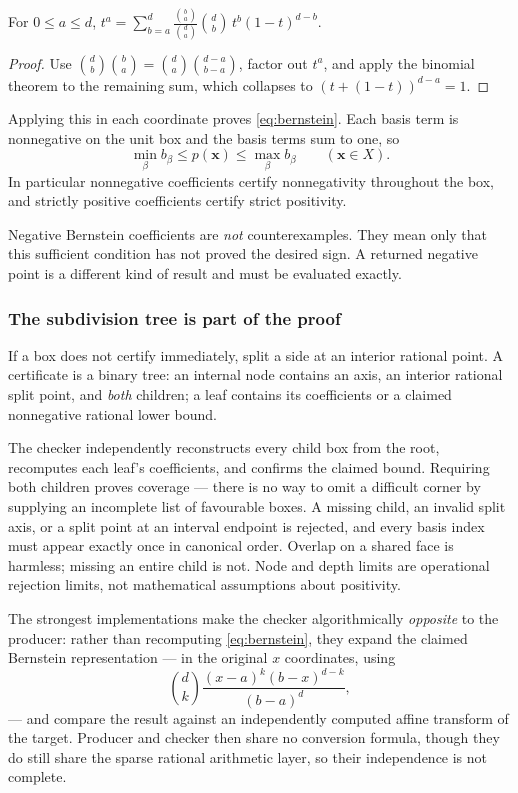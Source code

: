\begin{lemma}
For $0\le a\le d$,
$\displaystyle t^a=\sum_{b=a}^{d}\frac{\binom ba}{\binom da}\binom db\,
t^b(1-t)^{d-b}$.
\end{lemma}
\begin{proof}
Use $\binom db\binom ba=\binom da\binom{d-a}{b-a}$, factor out $t^a$, and apply
the binomial theorem to the remaining sum, which collapses to
$(t+(1-t))^{d-a}=1$.
\end{proof}

Applying this in each coordinate proves \eqref{eq:bernstein}. Each basis term is
nonnegative on the unit box and the basis terms sum to one, so
\[
 \min_\beta b_\beta\le p(\bm x)\le\max_\beta b_\beta\qquad(\bm x\in X).
\]
In particular nonnegative coefficients certify nonnegativity throughout the box,
and strictly positive coefficients certify strict positivity.

\begin{remark}
Negative Bernstein coefficients are \emph{not} counterexamples. They mean only
that this sufficient condition has not proved the desired sign. A returned
negative point is a different kind of result and must be evaluated exactly.
\end{remark}

\subsubsection*{The subdivision tree is part of the proof}

If a box does not certify immediately, split a side at an interior rational
point. A certificate is a binary tree: an internal node contains an axis, an
interior rational split point, and \emph{both} children; a leaf contains its
coefficients or a claimed nonnegative rational lower bound.

The checker independently reconstructs every child box from the root, recomputes
each leaf's coefficients, and confirms the claimed bound. Requiring both
children proves coverage --- there is no way to omit a difficult corner by
supplying an incomplete list of favourable boxes. A missing child, an invalid
split axis, or a split point at an interval endpoint is rejected, and every
basis index must appear exactly once in canonical order. Overlap on a shared
face is harmless; missing an entire child is not. Node and depth limits are
operational rejection limits, not mathematical assumptions about positivity.

The strongest implementations make the checker algorithmically \emph{opposite}
to the producer: rather than recomputing \eqref{eq:bernstein}, they expand the
claimed Bernstein representation --- in the original $x$ coordinates, using
\[
 \binom{d}{k}\frac{(x-a)^k(b-x)^{d-k}}{(b-a)^d},
\]
--- and compare the result against an independently computed affine transform of
the target. Producer and checker then share no conversion formula, though they
do still share the sparse rational arithmetic layer, so their independence is
not complete.

